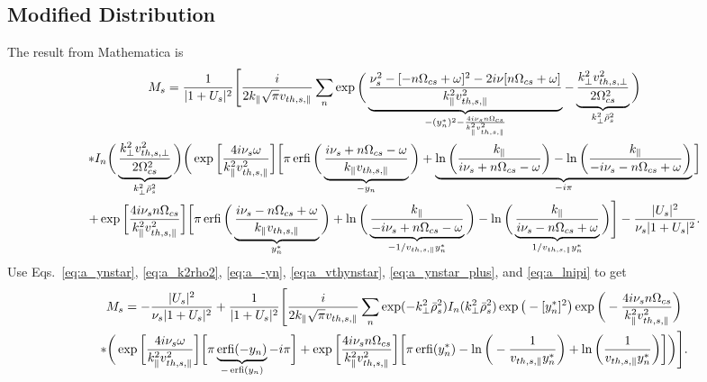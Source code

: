 \subsection{Modified Distribution}
The result from Mathematica is
\begin{multline}
	M_s = \frac{1}{|1+U_s|^2} \Bigg[
	\frac{i}{2k_\parallel \sqrt{\pi} v_{th,s,\parallel}} \sum_n
	\exp\bigg(\underbrace{ \frac{\nu_s^2-[-n\Omega_{cs}+\omega]^2-2i\nu[n\Omega_{cs}+\omega]}{k_\parallel^2 v_{th,s,\parallel}^2}}_{ -(y_n^*)^2 - \frac{4 i \nu_s n \Omega_{cs}}{k_\parallel^2 v_{th,s,\parallel}^2}}
	- \underbrace{\frac{k_\perp^2 v_{th,s,\perp}^2}{2\Omega_{cs}^2}}_{k_\perp^2 \bar{\rho}_s^2} \bigg) \\
	* I_n \bigg( \underbrace{ \frac{k_\perp^2 v_{th,s,\perp}^2}{2\Omega_{cs}^2}}_{k_\perp^2 \bar{\rho}_s^2} \bigg)
	\bigg( \exp\bigg[ \frac{4i\nu_s\omega}{k_\parallel^2v_{th,s,\parallel}^2} \bigg]
	\bigg[ \pi \operatorname{erfi} \bigg( \underbrace{\frac{i\nu_s+n\Omega_{cs}-\omega}{k_\parallel v_{th,s,\parallel}}}_{-y_n} \bigg) 
	+\underbrace{\ln \bigg( \frac{k_\parallel}{i\nu_s + n\Omega_{cs} - \omega} \bigg)
	- \ln \bigg( \frac{k_\parallel}{-i\nu_s - n\Omega_{cs} + \omega} \bigg)}_{-i\pi} 	\bigg] \\
	+ \exp \bigg[ \frac{4i\nu_sn\Omega_{cs}}{k_\parallel^2 v_{th,s,\parallel}^2} \bigg]
	\bigg[ \pi \operatorname{erfi} \bigg( \underbrace{\frac{i\nu_s-n\Omega_{cs}+\omega}{k_\parallel v_{th,s,\parallel}}}_{y_n^*} \bigg) 
	+\ln \bigg( \underbrace{\frac{k_\parallel}{-i\nu_s + n\Omega_{cs} - \omega} }_{-1/v_{th,s,\parallel} y_n^*}\bigg)
	- \ln \bigg( \underbrace{ \frac{k_\parallel}{i\nu_s - n\Omega_{cs} + \omega}}_{1/v_{th,s,\parallel} y_n^*}	\bigg) \Bigg]
	- \frac{|U_s|^2}{\nu_s|1+U_s|^2}.
\end{multline}
Use Eqs.~\ref{eq:a_ynstar}, \ref{eq:a_k2rho2}, \ref{eq:a_-yn}, \ref{eq:a_vthynstar}, \ref{eq:a_ynstar_plus}, and \ref{eq:a_lnipi} to get
\begin{multline}
	M_s = - \frac{|U_s|^2}{\nu_s |1+U_s|^2}+\frac{1}{|1+U_s|^2}
	\Bigg[\frac{i}{2k_\parallel \sqrt{\pi} v_{th,s,\parallel} }\sum_n
	\exp(-k_\perp^2 \bar{\rho}_s^2) I_n (k_\perp^2 \bar{\rho}_s^2)
	\exp\big(-[y_n^*]^2\big)
	\exp \bigg( -\frac{4 i \nu_s n\Omega_{cs}}{k_\parallel^2 v_{th,s,\parallel}^2}\bigg) \\
	* \bigg( \exp \bigg[ \frac{4i\nu_s\omega}{k_\parallel^2 v_{th,s,\parallel}^2}\bigg]
	  \bigg[ \pi \underbrace{\operatorname{erfi}(-y_n)}_{-\operatorname{erfi}(y_n)} - i\pi\bigg]
	  + \exp\bigg[ \frac{4i\nu_sn\Omega_{cs}}{k_\parallel^2v_{th,s,\parallel}^2} \bigg]
	  \bigg[ \pi \operatorname{erfi}(y_n^*)
	   - \ln \bigg( -\frac{1}{v_{th,s,\parallel}y_n^*} \bigg) 
	   + \ln \bigg( \frac{1}{v_{th,s,\parallel}y_n^*} \bigg)\bigg]
	   \bigg)
	\Bigg].
\end{multline}
